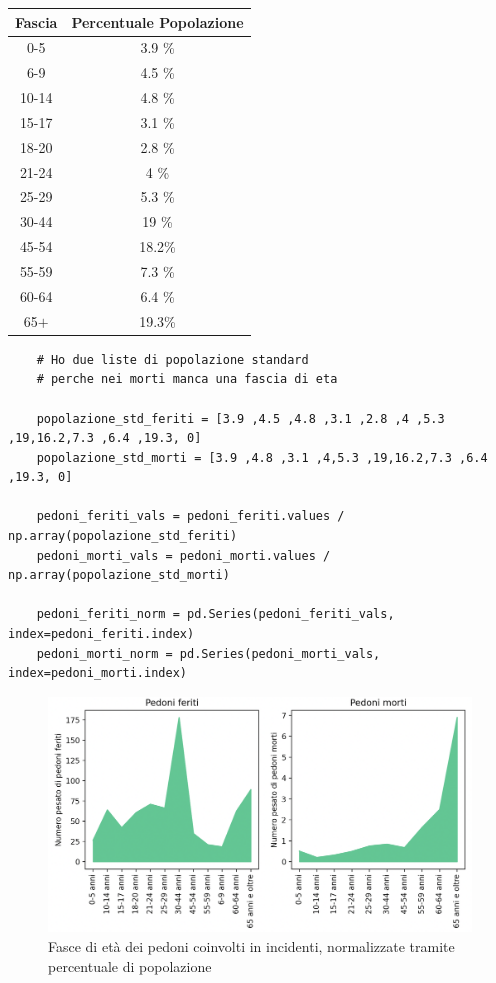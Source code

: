\documentclass[a4paper]{report}
\begin{document}
\begin{center}
    \def\arraystretch{1.5}%
    \begin{tabular}{ |c|c| } 
    \hline
    Fascia & Percentuale Popolazione \\ 
    \hline
    \rowcolor{TableGray}
    0-5     & 3.9 \% \\ 
    6-9     & 4.5 \% \\
    \rowcolor{TableGray}
    10-14   & 4.8 \% \\
    15-17   & 3.1 \% \\
    \rowcolor{TableGray}
    18-20   & 2.8 \% \\ 
    21-24   & 4   \% \\
    \rowcolor{TableGray}
    25-29   & 5.3 \% \\
    30-44   & 19  \% \\
    \rowcolor{TableGray}
    45-54   & 18.2\% \\ 
    55-59   & 7.3 \% \\
    \rowcolor{TableGray}
    60-64   & 6.4 \% \\
    65$+$   & 19.3\% \\
    \hline
    \end{tabular}
\end{center}

\begin{lstlisting}
    # Ho due liste di popolazione standard 
    # perche nei morti manca una fascia di eta

    popolazione_std_feriti = [3.9 ,4.5 ,4.8 ,3.1 ,2.8 ,4 ,5.3 ,19,16.2,7.3 ,6.4 ,19.3, 0]
    popolazione_std_morti = [3.9 ,4.8 ,3.1 ,4,5.3 ,19,16.2,7.3 ,6.4 ,19.3, 0]

    pedoni_feriti_vals = pedoni_feriti.values / np.array(popolazione_std_feriti)
    pedoni_morti_vals = pedoni_morti.values / np.array(popolazione_std_morti)

    pedoni_feriti_norm = pd.Series(pedoni_feriti_vals, index=pedoni_feriti.index)
    pedoni_morti_norm = pd.Series(pedoni_morti_vals, index=pedoni_morti.index)
\end{lstlisting}

\begin{figure}
    \includegraphics[width=\linewidth]{../src/incidenti/incidenti_senza_coords/pedoni/eta_pedoni_norm.png}
    \caption{Fasce di età dei pedoni coinvolti in incidenti, normalizzate tramite percentuale di popolazione}
    \label{fig:eta-pedoni-norm}
\end{figure}
\end{document}
